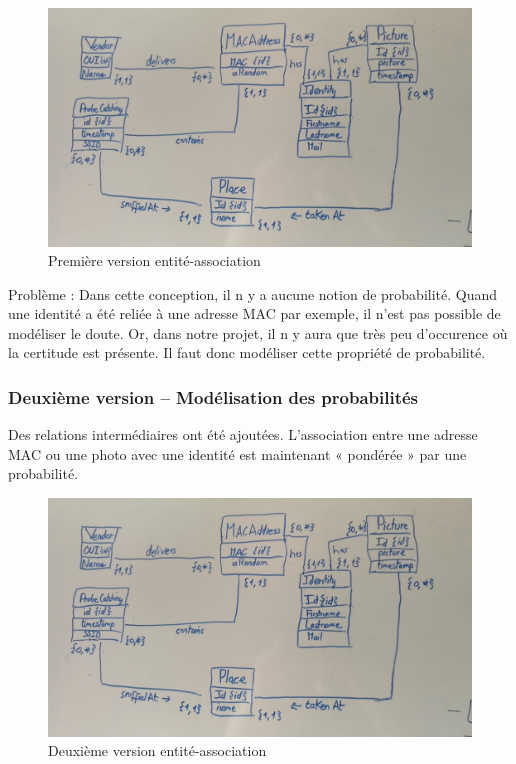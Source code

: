 \begin{figure}[H]
	\centering
	\includegraphics[width=12cm]{images/proto-1.png}
	\caption{Première version entité-association}
	\label{fig:arealytics}
\end{figure}

Problème : Dans cette conception, il n y a aucune notion de probabilité. Quand une identité a été reliée à une
adresse MAC par exemple, il n’est pas possible de modéliser le doute. Or, dans notre projet, il n y aura que très
peu d’occurence où la certitude est présente. Il faut donc modéliser cette propriété de probabilité.

\subsubsection{Deuxième version – Modélisation des probabilités}
Des relations intermédiaires ont été ajoutées. L’association entre une adresse MAC ou une photo avec une
identité est maintenant « pondérée » par une probabilité.

\begin{figure}[H]
	\centering
	\includegraphics[width=12cm]{images/proto-1.png}
	\caption{Deuxième version entité-association}
	\label{fig:arealytics}
\end{figure}

